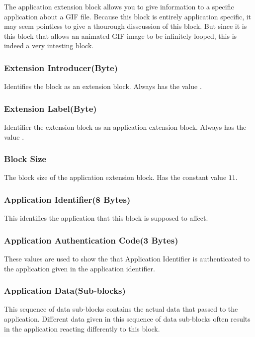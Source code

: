   The application extension block allows you to give information to a
  specific application about a GIF file. Because this block is
  entirely application specific, it may seem pointless to give a
  thourough disscussion of this block. But since it is this block that
  allows an animated GIF image to be infinitely looped, this is indeed
  a very intesting block.

  \subsubsection{Extension Introducer(Byte)}

  Identifies the block as an extension block. Always has the value
  .

  \subsubsection{Extension Label(Byte)}

  Identifier the extension block as an application extension
  block. Always has the value .

  \subsubsection{Block Size}

  The block size of the application extension block. Has the constant
  value $11$.

  \subsubsection{Application Identifier(8 Bytes)}

  This identifies the application that this block is supposed to
  affect.

  \subsubsection{Application Authentication Code(3 Bytes)}

  These values are used to show the that Application Identifier is
  authenticated to the application given in the application
  identifier.

  \subsubsection{Application Data(Sub-blocks)}

  This sequence of data sub-blocks contains the actual data that
  passed to the application. Different data given in this sequence of
  data sub-blocks often results in the application reacting
  differently to this block.

